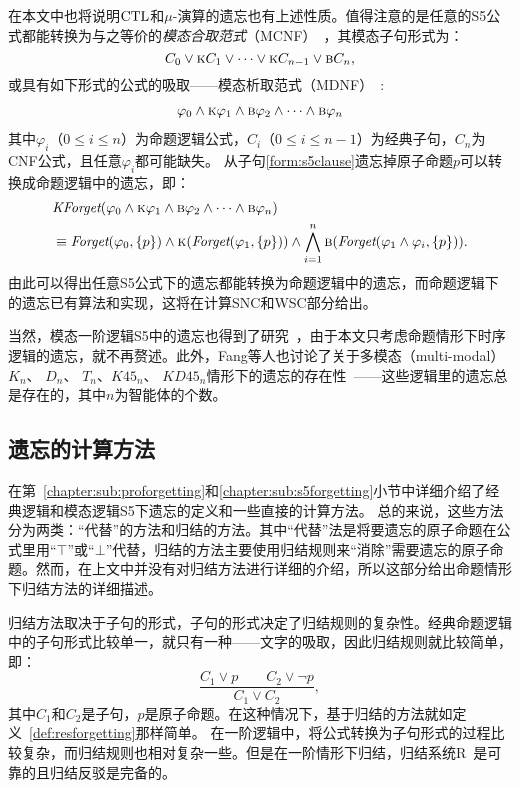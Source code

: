 在本文中也将说明$\textrm{CTL}$和$\mu$-演算的遗忘也有上述性质。值得注意的是任意的S5公式都能转换为与之等价的\emph{模态合取范式}（MCNF）~\cite{DBLP:conf/aaai/Bienvenu07}，其模态子句形式为：
$$C_0 \vee \textsc{k} C_1 \vee \dots \vee \textsc{k} C_{n-1} \vee \textsc{b} C_n,$$
或具有如下形式的公式的吸取——模态析取范式（MDNF）~\cite{Yongmei:IJCAI:2011,Zhang2008Properties}:
\begin{align}\label{form:s5clause}
	\varphi_0 \wedge \textsc{k} \varphi_1 \wedge \textsc{b} \varphi_2 \wedge \dots \wedge \textsc{b} \varphi_n
\end{align}
其中$\varphi_i$（$0\leq i \leq n$）为命题逻辑公式，$C_i$（$0\leq i \leq n-1$）为经典子句，$C_n$为CNF公式，且任意$\varphi_i$都可能缺失。
从子句\ref{form:s5clause}遗忘掉原子命题$p$可以转换成命题逻辑中的遗忘，即：
\begin{align*}
	&\textit{KForget}(\varphi_0 \wedge \textsc{k} \varphi_1 \wedge \textsc{b} \varphi_2 \wedge \dots \wedge \textsc{b} \varphi_n)\\
	&\equiv \textit{Forget}(\varphi_0, \{p\}) \wedge \textsc{k}(\textit{Forget}(\varphi_1, \{p\})) \wedge \bigwedge_{i=1}^{n}\textsc{b}(\textit{Forget}(\varphi_1 \wedge \varphi_i, \{p\})).
\end{align*}
由此可以得出任意S5公式下的遗忘都能转换为命题逻辑中的遗忘，而命题逻辑下的遗忘已有算法和实现，这将在计算SNC和WSC部分给出。



当然，模态一阶逻辑S5中的遗忘也得到了研究~\cite{Yongmei:IJCAI:2011}，由于本文只考虑命题情形下时序逻辑的遗忘，就不再赘述。此外，Fang等人也讨论了关于多模态（multi-modal）$K_n$、 $D_n$、 $T_n$、$K45_n$、 $KD45_n$情形下的遗忘的存在性~\cite{DBLP:journals/ai/FangLD19}——这些逻辑里的遗忘总是存在的，其中$n$为智能体的个数。

\subsection{遗忘的计算方法}
在第~\ref{chapter:sub:proforgetting}和\ref{chapter:sub:s5forgetting}小节中详细介绍了经典逻辑和模态逻辑S5下遗忘的定义和一些直接的计算方法。
总的来说，这些方法分为两类：“代替”的方法和归结的方法。其中“代替”法是将要遗忘的原子命题在公式里用“$\top$”或“$\bot$”代替，归结的方法主要使用归结规则来“消除”需要遗忘的原子命题。然而，在上文中并没有对归结方法进行详细的介绍，所以这部分给出命题情形下归结方法的详细描述。%

归结方法取决于子句的形式，子句的形式决定了归结规则的复杂性。经典命题逻辑中的子句形式比较单一，就只有一种——文字的吸取，因此归结规则就比较简单，即：
$$\frac{C_1 \vee p \qquad C_2 \vee \neg p}{C_1 \vee C_2},$$
其中$C_1$和$C_2$是子句，$p$是原子命题。在这种情况下，基于归结的方法就如定义~\ref{def:resforgetting}那样简单。
在一阶逻辑中，将公式转换为子句形式的过程比较复杂，而归结规则也相对复杂一些。但是在一阶情形下归结，归结系统R~\cite{gabbay2008second}是可靠的且归结反驳是完备的。


